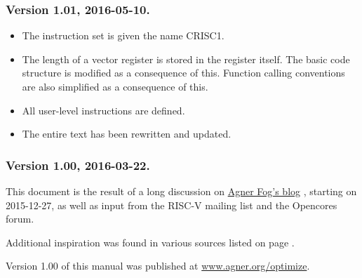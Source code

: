 \documentclass[forwardcom.tex]{subfiles}
\begin{document}
\subsubsection{Version 1.01, 2016-05-10.}
\begin{itemize}
\item The instruction set is given the name CRISC1.
\item The length of a vector register is stored in the register itself. The basic code structure is modified as a consequence of this. Function calling conventions are also simplified as a consequence of this.
\item All user-level instructions are defined.
\item The entire text has been rewritten and updated.
\end{itemize}

\subsubsection{Version 1.00, 2016-03-22.}
This document is the result of a long discussion on 
\href{http://www.agner.org/optimize/blog/read.php?i=421}{Agner Fog's blog}
, starting on 2015-12-27, as well as input from the RISC-V mailing list and the Opencores forum.
\vspace{2mm}

Additional inspiration was found in various sources listed on page \pageref{referencesToIntroduction}. 
\vspace{2mm}

Version 1.00 of this manual was published at 
\href{http://www.agner.org/optimize}{www.agner.org/optimize}.
\end{document}
